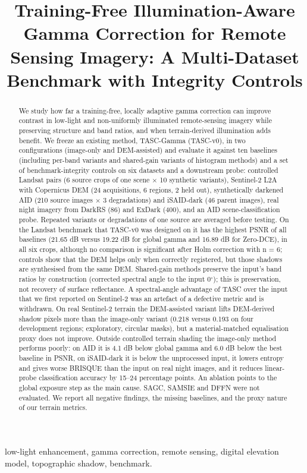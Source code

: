 \documentclass[conference]{IEEEtran}
\begin{document}
\title{Training-Free Illumination-Aware Gamma Correction for Remote Sensing Imagery: A Multi-Dataset Benchmark with Integrity Controls}
\author{}
\maketitle
\begin{abstract}
We study how far a training-free, locally adaptive gamma correction can improve contrast in low-light and non-uniformly illuminated remote-sensing imagery while preserving structure and band ratios, and when terrain-derived illumination adds benefit. We freeze an existing method, TASC-Gamma (TASC-v0), in two configurations (image-only and DEM-assisted) and evaluate it against ten baselines (including per-band variants and shared-gain variants of histogram methods) and a set of benchmark-integrity controls on six datasets and a downstream probe: controlled Landsat pairs (6 source crops of one scene $\times$ 10 synthetic variants), Sentinel-2 L2A with Copernicus DEM (24 acquisitions, 6 regions, 2 held out), synthetically darkened AID (210 source images $\times$ 3 degradations) and iSAID-dark (46 parent images), real night imagery from DarkRS (86) and ExDark (400), and an AID scene-classification probe. Repeated variants or degradations of one source are averaged before testing. On the Landsat benchmark that TASC-v0 was designed on it has the highest PSNR of all baselines (21.65 dB versus 19.22 dB for global gamma and 16.89 dB for Zero-DCE), in all six crops, although no comparison is significant after Holm correction with n = 6; controls show that the DEM helps only when correctly registered, but those shadows are synthesised from the same DEM. Shared-gain methods preserve the input's band ratios by construction (corrected spectral angle to the input 0$^{\circ}$); this is preservation, not recovery of surface reflectance. A spectral-angle advantage of TASC over the input that we first reported on Sentinel-2 was an artefact of a defective metric and is withdrawn. On real Sentinel-2 terrain the DEM-assisted variant lifts DEM-derived shadow pixels more than the image-only variant (0.218 versus 0.193 on four development regions; exploratory, circular masks), but a material-matched equalisation proxy does not improve. Outside controlled terrain shading the image-only method performs poorly: on AID it is 4.1 dB below global gamma and 6.0 dB below the best baseline in PSNR, on iSAID-dark it is below the unprocessed input, it lowers entropy and gives worse BRISQUE than the input on real night images, and it reduces linear-probe classification accuracy by 15--24 percentage points. An ablation points to the global exposure step as the main cause. SAGC, SAMSIE and DFFN were not evaluated. We report all negative findings, the missing baselines, and the proxy nature of our terrain metrics.
\end{abstract}
\begin{IEEEkeywords}
low-light enhancement, gamma correction, remote sensing, digital elevation model, topographic shadow, benchmark.
\end{IEEEkeywords}
\end{document}

